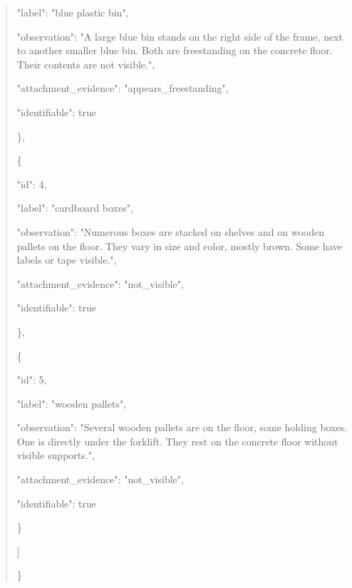 \documentclass[10pt,a4paper]{article}
\begin{document}
\begin{quote}
      "label":\allowbreak{} "blue plastic bin",\allowbreak{}\par
      "observation":\allowbreak{} "A large blue bin stands on the right side of the frame,\allowbreak{} next to another smaller blue bin. Both are freestanding on the concrete floor. Their contents are not visible.",\allowbreak{}\par
      "attachment\_evidence":\allowbreak{} "appears\_freestanding",\allowbreak{}\par
      "identifiable":\allowbreak{} true\par
    \},\allowbreak{}\par
    \{\par
      "id":\allowbreak{} 4,\allowbreak{}\par
      "label":\allowbreak{} "cardboard boxes",\allowbreak{}\par
      "observation":\allowbreak{} "Numerous boxes are stacked on shelves and on wooden pallets on the floor. They vary in size and color,\allowbreak{} mostly brown. Some have labels or tape visible.",\allowbreak{}\par
      "attachment\_evidence":\allowbreak{} "not\_visible",\allowbreak{}\par
      "identifiable":\allowbreak{} true\par
    \},\allowbreak{}\par
    \{\par
      "id":\allowbreak{} 5,\allowbreak{}\par
      "label":\allowbreak{} "wooden pallets",\allowbreak{}\par
      "observation":\allowbreak{} "Several wooden pallets are on the floor,\allowbreak{} some holding boxes. One is directly under the forklift. They rest on the concrete floor without visible supports.",\allowbreak{}\par
      "attachment\_evidence":\allowbreak{} "not\_visible",\allowbreak{}\par
      "identifiable":\allowbreak{} true\par
    \}\par
  ]\par
\}
\end{quote}
\end{document}
